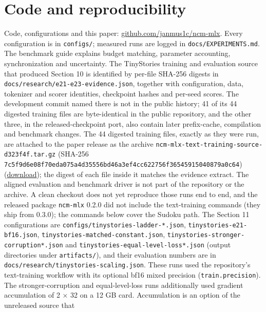 \documentclass[
  british,
]{article}
\begin{document}
\section*{Code and reproducibility}\label{code-and-reproducibility}

Code, configurations and this paper:
\href{https://github.com/janmus1c/ncm-mlx}{github.com/janmus1c/ncm-mlx}.
Every configuration is in \texttt{configs/}; measured runs are logged in
\texttt{docs/EXPERIMENTS.md}. The benchmark guide explains budget
matching, parameter accounting, synchronization and uncertainty. The
TinyStories training and evaluation source that produced Section 10 is
identified by per-file SHA-256 digests in
\texttt{docs/research/e21-e23-evidence.json}, together with
configuration, data, tokenizer and scorer identities, checkpoint hashes
and per-seed scores. The development commit named there is not in the
public history; 41 of its 44 digested training files are byte-identical
in the public repository, and the other three, in the
released-checkpoint port, also contain later prefix-cache, compilation
and benchmark changes. The 44 digested training files, exactly as they
were run, are attached to the paper release as the archive
\texttt{ncm-mlx-text-training-source-d323f4f.tar.gz} (SHA-256
\texttt{7c5f9d6e08f70eda075a4d35556bd46a3ef4cc622756f36545915040879a0c64})
(\href{https://github.com/janmus1c/ncm-mlx/releases/download/paper-v0.12/ncm-mlx-text-training-source-d323f4f.tar.gz}{download});
the digest of each file inside it matches the evidence extract. The
aligned evaluation and benchmark driver is not part of the repository or
the archive. A clean checkout does not yet reproduce those runs end to
end, and the released package \texttt{ncm-mlx} 0.2.0 did not include the
text-training commands (they ship from 0.3.0); the commands below cover
the Sudoku path. The Section 11 configurations are
\texttt{configs/tinystories-ladder-*.json},
\texttt{tinystories-e21-bf16.json},
\texttt{tinystories-matched-constant.json},
\texttt{tinystories-stronger-corruption*.json} and
\texttt{tinystories-equal-level-loss*.json} (output directories under
\texttt{artifacts/}), and their evaluation numbers are in
\texttt{docs/research/tinystories-scaling.json}. These runs used the
repository's text-training workflow with its optional bf16 mixed
precision (\texttt{train.precision}). The stronger-corruption and
equal-level-loss runs additionally used gradient accumulation of 2 × 32
on a 12 GB card. Accumulation is an option of the unreleased source that
\end{document}
